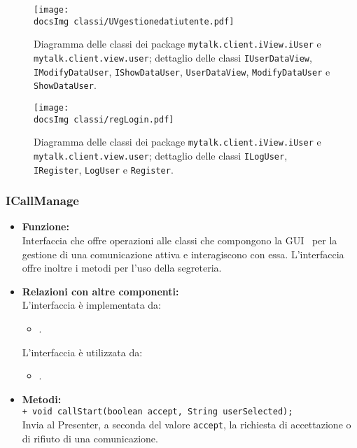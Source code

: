 {\begin{sloppypar}
{	\begin{figure}[h!tbp]
		\centering
		\texttt{[image: \\docsImg classi/UVgestionedatiutente.pdf]}
		\caption{Diagramma delle classi dei package \nolinkurl{mytalk.client.iView.iUser} e \nolinkurl{mytalk.client.view.user}; dettaglio delle classi \nolinkurl{IUserDataView}, \nolinkurl{IModifyDataUser}, \nolinkurl{IShowDataUser}, \nolinkurl{UserDataView}, \nolinkurl{ModifyDataUser} e  \nolinkurl{ShowDataUser}.}
	\end{figure}	
	
	\begin{figure}[h!tbp]
		\centering
		\texttt{[image: \\docsImg classi/regLogin.pdf]}
		\caption{Diagramma delle classi dei package \nolinkurl{mytalk.client.iView.iUser} e \nolinkurl{mytalk.client.view.user}; dettaglio delle classi \nolinkurl{ILogUser}, \nolinkurl{IRegister}, \nolinkurl{LogUser} e \nolinkurl{Register}.}
	\end{figure}	
	
	\newpage
		\subsubsection{ICallManage}\label{ssub:ICallManage}{
		\begin{itemize}
			\item[]  \textbf{Funzione:}\\
				Interfaccia che offre operazioni alle classi che compongono la GUI\g~ per la 
				gestione di una comunicazione attiva e interagiscono con essa. L'interfaccia offre inoltre i metodi per l'uso della segreteria.\\
		
			\item[]  \textbf{Relazioni con altre componenti:} \\
				L'interfaccia è implementata da:
				\begin{itemize}
					\item[] .
				\end{itemize}
				L'interfaccia è utilizzata da:
				\begin{itemize}
					\item[] .\\
				\end{itemize}
					
			\item[]  \textbf{Metodi:}\\
				\texttt{+ void callStart(boolean accept, String userSelected);}\\
				Invia al Presenter, a seconda del valore \texttt{accept}, la richiesta di accettazione o di rifiuto di una 
				comunicazione.\\


\end{itemize}}}
\end{sloppypar}}
